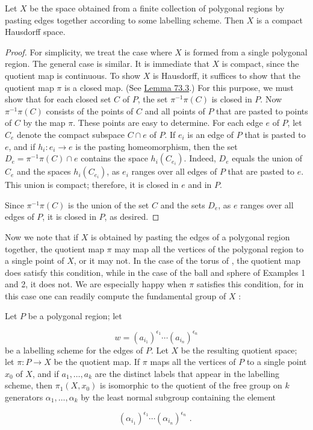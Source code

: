 \begin{theorem}
\label{thm:\thetheorem}
	Let \(X\) be the space obtained from a finite collection of polygonal regions by pasting edges together according to some labelling scheme. Then \(X\) is a compact Hausdorff space.
\end{theorem}

\begin{proof}
	For simplicity, we treat the case where \(X\) is formed from a single polygonal region. The general case is similar.
It is immediate that \(X\) is compact, since the quotient map is continuous. To show \(X\) is Hausdorff, it suffices to show that the quotient map \(\pi\) is a closed map. (See \hyperref[lem:73.3]{Lemma 73.3}.) For this purpose, we must show that for each closed set \(C\) of \(P\), the set \({\pi }^{-1}\pi ( C)\) is closed in \(P\). Now \({\pi }^{-1}\pi ( C)\) consists of the points of \(C\) and all points of \(P\) that are pasted to points of \(C\) by the map \(\pi\). These points are easy to determine. For each edge \(e\) of \(P\), let \(C_{e}\) denote the compact subspace \(C \cap e\) of \(P\). If \(e_{i}\) is an edge of \(P\) that is pasted to \(e\), and if \(h_{i} : e_{i} \rightarrow e\) is the pasting homeomorphism, then the set \(D_{e} = {\pi }^{-1}\pi ( C) \cap e\) contains the space \(h_{i}( C_{e_{i}})\). Indeed, \(D_{e}\) equals the union of \(C_{e}\) and the spaces \(h_{i}( C_{e_{i}})\), as \(e_{i}\) ranges over all edges of \(P\) that are pasted to \(e\). This union is compact; therefore, it is closed in \(e\) and in \(P\).

Since \({\pi }^{-1}\pi ( C)\) is the union of the set \(C\) and the sets \(D_{e}\), as \(e\) ranges over all edges of \(P\), it is closed in \(P\), as desired.
\end{proof}

Now we note that if \(X\) is obtained by pasting the edges of a polygonal region together, the quotient map \(\pi\) may map all the vertices of the polygonal region to a single point of \(X\), or it may not. In the case of the torus of , the quotient map does satisfy this condition, while in the case of the ball and sphere of Examples 1 and 2, it does not. We are especially happy when \(\pi\) satisfies this condition, for in this case one can readily compute the fundamental group of \(X\) :
\begin{theorem}
\label{thm:\thetheorem}
	Let \(P\) be a polygonal region; let

\[
w = {( a_{i_{1}}) }^{{\epsilon }_{1}}\cdots {( a_{i_{n}}) }^{{\epsilon }_{n}}
\]
be a labelling scheme for the edges of \(P\). Let \(X\) be the resulting quotient space; let \(\pi : P \rightarrow X\) be the quotient map. If \(\pi\) maps all the vertices of \(P\) to a single point \(x_{0}\) of \(X\), and if \(a_{1},\ldots ,a_{k}\) are the distinct labels that appear in the labelling scheme, then \({\pi }_{1}( {X,x_{0}})\) is isomorphic to the quotient of the free group on \(k\) generators \({\alpha }_{1},\ldots ,{\alpha }_{k}\) by the least normal subgroup containing the element

\[
{( {\alpha }_{i_{1}}) }^{{\epsilon }_{1}}\cdots {( {\alpha }_{i_{n}}) }^{{\epsilon }_{n}}\text{ . }
\]
\end{theorem}

